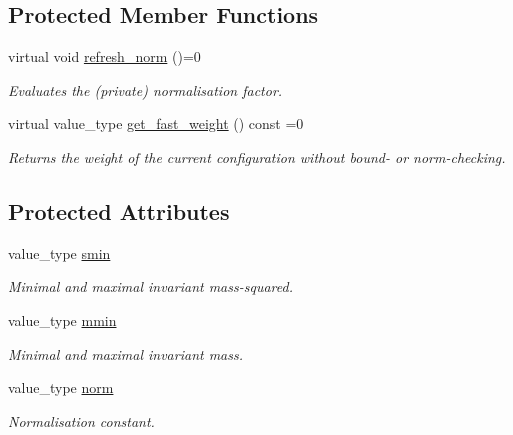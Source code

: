 \subsection*{Protected Member Functions}
\begin{DoxyCompactItemize}
\item 
\hypertarget{a00482_a1db97a09b0190ab809f411b641224271}{virtual void \hyperlink{a00482_a1db97a09b0190ab809f411b641224271}{refresh\-\_\-norm} ()=0}\label{a00482_a1db97a09b0190ab809f411b641224271}

\begin{DoxyCompactList}\small\item\em Evaluates the (private) normalisation factor. \end{DoxyCompactList}\item 
virtual value\-\_\-type \hyperlink{a00482_a1c77ba845ada06f770c0b80fe03354fe}{get\-\_\-fast\-\_\-weight} () const =0
\begin{DoxyCompactList}\small\item\em Returns the weight of the current configuration without bound-\/ or norm-\/checking. \end{DoxyCompactList}\end{DoxyCompactItemize}
\subsection*{Protected Attributes}
\begin{DoxyCompactItemize}
\item 
\hypertarget{a00482_a38479aa07f22462994009ea4c6a49870}{value\-\_\-type \hyperlink{a00482_a38479aa07f22462994009ea4c6a49870}{smin}}\label{a00482_a38479aa07f22462994009ea4c6a49870}

\begin{DoxyCompactList}\small\item\em Minimal and maximal invariant mass-\/squared. \end{DoxyCompactList}\item 
\hypertarget{a00482_a1cb5bd69e1500b77212a51a052e1e6b3}{value\-\_\-type \hyperlink{a00482_a1cb5bd69e1500b77212a51a052e1e6b3}{mmin}}\label{a00482_a1cb5bd69e1500b77212a51a052e1e6b3}

\begin{DoxyCompactList}\small\item\em Minimal and maximal invariant mass. \end{DoxyCompactList}\item 
\hypertarget{a00482_a058384fae92fe2b322f7298adcc3c05a}{value\-\_\-type \hyperlink{a00482_a058384fae92fe2b322f7298adcc3c05a}{norm}}\label{a00482_a058384fae92fe2b322f7298adcc3c05a}

\begin{DoxyCompactList}\small\item\em Normalisation constant. \end{DoxyCompactList}\end{DoxyCompactItemize}
